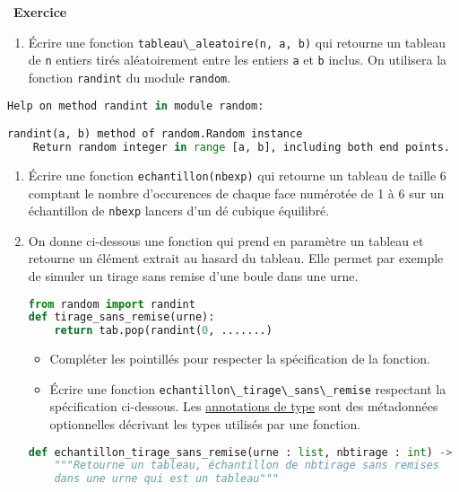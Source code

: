 \documentclass[
  11pt,
]{article}
\newcommand{\passthrough}[1]{#1}
\providecommand{\tightlist}{%
  \setlength{\itemsep}{0pt}\setlength{\parskip}{0pt}}
\newcounter{exo}
\newenvironment{exercice}[1]
{\par \medskip   \addtocounter{exo}{1} \noindent  
\begin{bclogo}[arrondi =0.1,   noborder = true, logo=\bccrayon, marge=4]{~\textbf{Exercice} \textbf{\theexo} {\itshape #1} }  \par}
{
\end{bclogo}
 \par \bigskip }
\newcounter{def}
\begin{document}
\begin{exercice}{}

\begin{enumerate}
\def\labelenumi{\arabic{enumi}.}
\tightlist
\item
  Écrire une fonction
  \passthrough{\lstinline!tableau\_aleatoire(n, a, b)!} qui retourne un
  tableau de \passthrough{\lstinline!n!} entiers tirés aléatoirement
  entre les entiers \passthrough{\lstinline!a!} et
  \passthrough{\lstinline!b!} inclus. On utilisera la fonction
  \passthrough{\lstinline!randint!} du module
  \passthrough{\lstinline!random!}.
\end{enumerate}

\begin{lstlisting}[language=Python]
Help on method randint in module random:

randint(a, b) method of random.Random instance
    Return random integer in range [a, b], including both end points.
\end{lstlisting}

\begin{enumerate}
\def\labelenumi{\arabic{enumi}.}
\setcounter{enumi}{1}
\item
  Écrire une fonction \passthrough{\lstinline!echantillon(nbexp)!} qui
  retourne un tableau de taille 6 comptant le nombre d'occurences de
  chaque face numérotée de 1 à 6 sur un échantillon de
  \passthrough{\lstinline!nbexp!} lancers d'un dé cubique équilibré.
\item
  On donne ci-dessous une fonction qui prend en paramètre un tableau et
  retourne un élément extrait au hasard du tableau. Elle permet par
  exemple de simuler un tirage sans remise d'une boule dans une urne.

\begin{lstlisting}[language=Python]
from random import randint
def tirage_sans_remise(urne):
    return tab.pop(randint(0, .......)
\end{lstlisting}

  \begin{itemize}
  \tightlist
  \item
    Compléter les pointillés pour respecter la spécification de la
    fonction.
  \item
    Écrire une fonction
    \passthrough{\lstinline!echantillon\_tirage\_sans\_remise!}
    respectant la spécification ci-dessous. Les
    \href{https://docs.python.org/fr/3/tutorial/controlflow.html\#function-annotations}{annotations
    de type} sont des métadonnées optionnelles décrivant les types
    utilisés par une fonction.
  \end{itemize}

\begin{lstlisting}[language=Python]
def echantillon_tirage_sans_remise(urne : list, nbtirage : int) -> list:
    """Retourne un tableau, échantillon de nbtirage sans remises
    dans une urne qui est un tableau"""
\end{lstlisting}
\end{enumerate}

\end{exercice}
\end{document}
